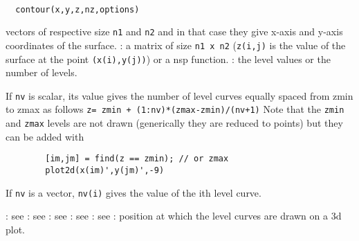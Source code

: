 
\begin{mandesc}
  \\ %
\end{mandesc}
\begin{calling_sequence}
\begin{verbatim}
  contour(x,y,z,nz,options)
\end{verbatim}
\end{calling_sequence}

\begin{parameters}
  \begin{varlist}
     vectors of respective size \verb!n1! and \verb!n2! and in that case they give x-axis
    and y-axis coordinates of the surface.
    :  a matrix of size \verb!n1 x n2! (\verb!z(i,j)! is the
    value of the surface at the point \verb!(x(i),y(j))!) or a nsp function.
    : the level values or the number of levels.
    \begin{varlist}
      \vname{-}If \verb!nv! is scalar, its value gives the
      number of level curves equally spaced from zmin to zmax as
      follows \verb!z= zmin + (1:nv)*(zmax-zmin)/(nv+1)!
      Note that the \verb!zmin! and \verb!zmax!
      levels are not drawn (generically they are reduced to points)
      but they can be added with
      \begin{Verbatim}
        [im,jm] = find(z == zmin); // or zmax
        plot2d(x(im)',y(jm)',-9)
      \end{Verbatim}
      \vname{-}If \verb!nv! is a vector, \verb!nv(i)! gives
      the value of the ith level curve.
    \end{varlist}
    : see 
    : see 
    : see 
    : see 
    : see 
    : position at which the level curves are drawn on a 3d plot.
  \end{varlist}
\end{parameters}

